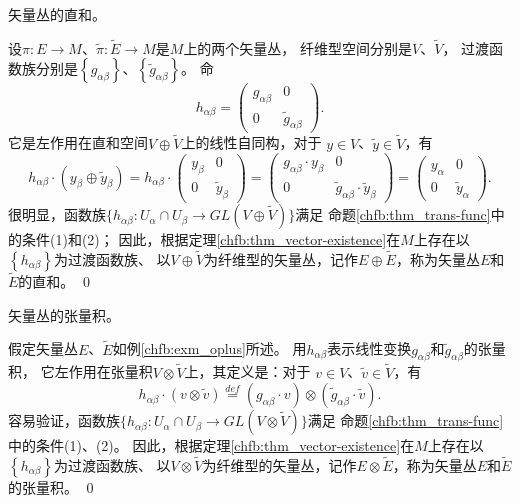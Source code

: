 \begin{example}\label{chfb:exm_oplus}
    矢量丛的直和。
\end{example}
设$\pi: E \rightarrow M$、$\tilde{\pi}: \widetilde{E} \rightarrow M$是$M$上的两个矢量丛，
纤维型空间分别是$V$、$\tilde{V}$，
过渡函数族分别是$\left\{g_{\alpha \beta}\right\}$、$\left\{\tilde{g}_{\alpha \beta}\right\}$。 命
\begin{equation*}
    h_{\alpha \beta}=\begin{pmatrix}
        g_{\alpha \beta} & 0 \\ 0 & \tilde{g}_{\alpha \beta}
    \end{pmatrix}.
\end{equation*}
它是左作用在直和空间$V \oplus \tilde{V}$上的线性自同构，对于 $y \in V$、$ \tilde{y} \in \tilde{V}$，有
\begin{equation*}
    h_{\alpha \beta} \cdot (y_\beta \oplus \tilde{y}_\beta)
    =h_{\alpha \beta} \cdot \begin{pmatrix}
        y_{\beta} & 0 \\ 0 & \tilde{y}_{\beta}
    \end{pmatrix}
    =\begin{pmatrix}
        g_{\alpha \beta}\cdot  y_{\beta} & 0 \\ 0 & \tilde{g}_{\alpha \beta}\cdot  \tilde{y}_{\beta}
    \end{pmatrix}
    =\begin{pmatrix}
        y_{\alpha} & 0 \\ 0 & \tilde{y}_{\alpha}
    \end{pmatrix} .
\end{equation*}
很明显，函数族$\{h_{\alpha \beta}: U_\alpha \cap U_\beta \rightarrow GL(V \oplus \tilde{V})\}$满足
命题\ref{chfb:thm_trans-func}中的条件(1)和(2)；
因此，根据定理\ref{chfb:thm_vector-existence}在$M$上存在以$\left\{h_{\alpha \beta}\right\}$为过渡函数族、
以$V\oplus \tilde{V}$为纤维型的矢量丛，记作$E\oplus\widetilde{E}$，称为矢量丛$E$和$\widetilde{E}$的直和。
\qed

\begin{example}\label{chfb:exm_otimes}
    矢量丛的张量积。
\end{example}
假定矢量丛$E$、$\tilde{E}$如例\ref{chfb:exm_oplus}所述。
用$h_{\alpha \beta}$表示线性变换$g_{\alpha \beta}$和$\tilde{g}_{\alpha \beta}$的张量积，
它左作用在张量积$V \otimes \tilde{V}$上，其定义是：对于 $v \in V$、$ \tilde{v} \in \tilde{V}$，有
\begin{equation*}
    h_{\alpha \beta} \cdot(v \otimes \tilde{v})
    \overset{def}{=}\left(g_{\alpha \beta} \cdot v\right) \otimes
    \left(\tilde{g}_{\alpha \beta} \cdot \tilde{v}\right) .
\end{equation*}
容易验证，函数族$\{h_{\alpha \beta}: U_\alpha \cap U_\beta \rightarrow GL(V \otimes \tilde{V})\}$满足
命题\ref{chfb:thm_trans-func}中的条件(1)、(2)。
因此，根据定理\ref{chfb:thm_vector-existence}在$M$上存在以$\left\{h_{\alpha \beta}\right\}$为过渡函数族、
以$V\otimes\tilde{V}$为纤维型的矢量丛，记作$E \otimes \tilde{E}$，称为矢量丛$E$和$\tilde{E}$ 的张量积。
\qed

